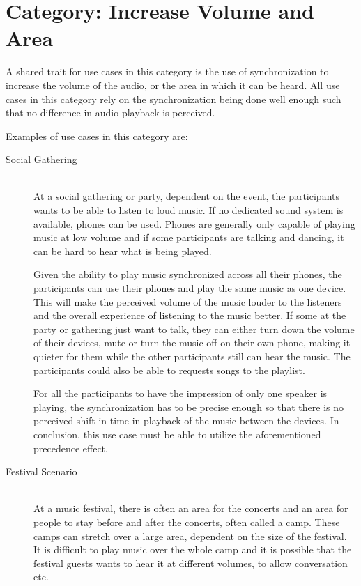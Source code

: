 \section{Category: Increase Volume and Area}\label{sec:category_increase_volume_and_area}
A shared trait for use cases in this category is the use of synchronization to increase the volume of the audio, or the area in which it can be heard.
All use cases in this category rely on the synchronization being done well enough such that no difference in audio playback is perceived.

Examples of use cases in this category are:
\begin{description}
    \item[Social Gathering] \hfill\\
        At a social gathering or party, dependent on the event, the participants wants to be able to listen to loud music.
        If no dedicated sound system is available, phones can be used.
        Phones are generally only capable of playing music at low volume and if some participants are talking and dancing, it can be hard to hear what is being played.

        Given the ability to play music synchronized across all their phones, the participants can use their phones and play the same music as one device.
        This will make the perceived volume of the music louder to the listeners and the overall experience of listening to the music better.
        If some at the party or gathering just want to talk, they can either turn down the volume of their devices, mute or turn the music off on their own phone,
        making it quieter for them while the other participants still can hear the music.
        The participants could also be able to requests songs to the playlist.

        For all the participants to have the impression of only one speaker is playing,
        the synchronization has to be precise enough so that there is no perceived shift in time in playback of the music between the devices.
        In conclusion, this use case must be able to utilize the aforementioned precedence effect.

    \item[Festival Scenario] \hfill\\
        At a music festival, there is often an area for the concerts and an area for people to stay before and after the concerts, often called a camp.
        These camps can stretch over a large area, dependent on the size of the festival.
        It is difficult to play music over the whole camp and it is possible that the festival guests wants to hear it at different volumes, to allow conversation etc.


\end{description}
